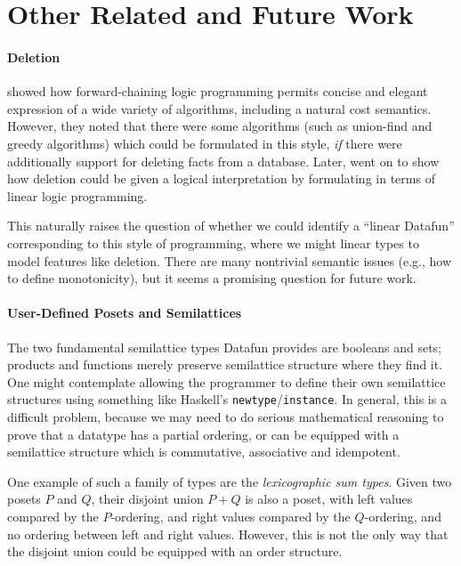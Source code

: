 \section{Other Related and Future Work}
\label{sec:futurework}

\paragraph{Deletion} \citet{logical-algorithms} showed how
forward-chaining logic programming permits concise and elegant
expression of a wide variety of algorithms, including a natural cost
semantics. However, they noted that there were some algorithms (such
as union-find and greedy algorithms) which could be formulated in this
style, \emph{if} there were additionally support for deleting facts
from a database. Later, \citet{linear-logical-algorithms} went on to
show how deletion could be given a logical interpretation by
formulating in terms of linear logic programming.

This naturally raises the question of whether we could identify a
``linear Datafun'' corresponding to this style of programming, where
we might linear types to model features like deletion. There are many
nontrivial semantic issues (e.g., how to define monotonicity), but
it seems a promising question for future work.

\paragraph{User-Defined Posets and Semilattices}
The two fundamental semilattice types Datafun provides are booleans and sets;
products and functions merely preserve semilattice structure where they find
it. One might contemplate allowing the programmer to define their own
semilattice structures using something like Haskell's
\texttt{newtype}/\texttt{instance}. In general, this is a difficult
problem, because we may need to do serious mathematical
reasoning to prove that a datatype has a partial ordering, or can be
equipped with a semilattice structure which is commutative, associative
and idempotent.

One example of such a family of types are the \emph{lexicographic sum
  types}. Given two posets $P$ and $Q$, their disjoint union $P + Q$
is also a poset, with left values compared by the $P$-ordering, and
right values compared by the $Q$-ordering, and no ordering between
left and right values. However, this is not the only way that the
disjoint union could be equipped with an order structure.

